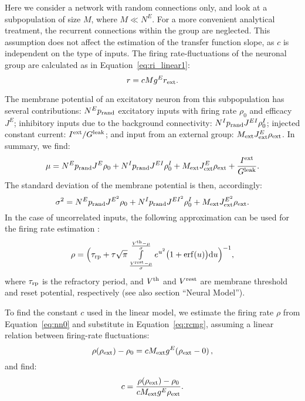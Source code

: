     Here we consider a network with random connections only, and look at a
    subpopulation of size $M$, where $M \ll N^E$. For a more convenient
    analytical treatment, the recurrent connections within the group are
    neglected. This assumption does not affect the estimation of the transfer
    function slope, as $c$ is independent on the type of inputs. The firing
    rate-fluctuations of the neuronal group are calculated as in
    Equation~\ref{eq:ri_linear1}:
    \begin{equation}
      r = c M g^E r_{\rm ext}.
      \label{eq:rcmg}
    \end{equation}

    The membrane potential of an excitatory neuron from this subpopulation has
    several contributions: $N^Ep_{\rm rand}$ excitatory inputs with firing rate
    $\rho_0$ and efficacy $J^E$; inhibitory inputs due to the background
    connectivity: $N^I p_{\rm rand} J^{EI} \rho_0^I$; injected constant
    current: $I^{\rm ext}/G^{\rm leak}$; and input from an external group:
    $M_{\rm ext} J^E_{\rm ext} \rho_{\rm ext} $. In summary, we find:
    \[
      \mu = N^E p_{\rm rand} J^E \rho_0 + N^I p_{\rm rand} J^{EI} \rho_0^I + M_{\rm ext} J^E_{\rm ext} \rho_{\rm ext} + \frac{I^{\rm ext}}{G^{\rm leak}} .
    \]
    The standard deviation of the membrane potential is then, accordingly:
    \[
      \sigma^2 = N^E p_{\rm rand} J^{E^2} \rho_0 + N^I p_{\rm rand} J^{EI^2} \rho_0^I + M_{\rm ext} J^{E^2}_{\rm ext} \rho_{\rm ext} .
    \]
    In the case of uncorrelated inputs, the following approximation can be used
    for the firing rate estimation \citep{Ricciardi2013, Amit1997, Brunel2000,
    Gerstner2002}:
    \begin{equation}
      \rho = \Big(\tau_{\rm rp} + \tau \sqrt{\pi} \int_{\frac{V^{\rm rest}-\mu}{\sigma}}^{\frac{V^{\rm th}-\mu}{\sigma}} e^{u^2} \big( 1+ {\rm erf}(u) \big) {\rm d}u \Big)^{-1},
      \label{eq:nn0}
    \end{equation}
    where $\tau_{\rm rp}$ is the refractory period, and $V^{\rm th}$ and
    $V^{\rm rest}$ are membrane threshold and reset potential, respectively
    (see also section ``Neural Model'').

    To find the constant $c$ used in the linear model, we estimate the firing
    rate $\rho$ from Equation~\ref{eq:nn0} and substitute in Equation~\ref{eq:rcmg},
    assuming a linear relation between firing-rate fluctuations:
    \begin{equation}
      \rho(\rho_{\rm ext}) - \rho_{0} = c M_{\rm ext} g^E (\rho_{\rm ext} - 0) \, ,
      \label{eq:ri_linear2}
    \end{equation}
    and find:
    \begin{equation}
      c = \frac{\rho(\rho_{\rm ext}) - \rho_0}{ c M_{\rm ext} g^E \rho_{\rm ext}}.
      \label{eq:c1}
    \end{equation}

